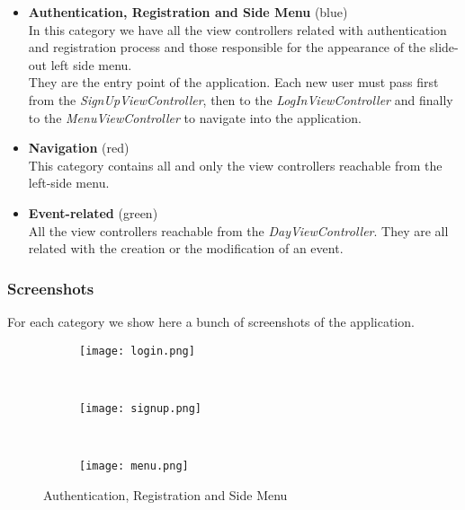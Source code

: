 \begin{itemize}
	\item \textbf{Authentication, Registration and Side Menu} (blue)\\
	In this category we have all the view controllers related with authentication and registration process and those responsible for the appearance of the slide-out left side menu.\\
	They are the entry point of the application.  Each new user must pass first from the \textit{SignUpViewController}, then to the \textit{LogInViewController} and finally to the \textit{MenuViewController} to navigate into the application.
	 
	\item \textbf{Navigation} (red)\\
	This category contains all and only the view controllers reachable from the left-side menu.
	
	\item \textbf{Event-related} (green)\\
	All the view controllers reachable from the \textit{DayViewController}. They are all related with the creation or the modification of an event.
\end{itemize}

\subsubsection*{Screenshots}
For each category we show here a bunch of screenshots of the application.
\begin{figure}[H]
	\centering
	\begin{subfigure}{0.25\textwidth}
		\centering
		\texttt{[image: login.png]}
	\end{subfigure}
	~
	\begin{subfigure}{0.25\textwidth}
		\centering
		\texttt{[image: signup.png]}
	\end{subfigure}
	~
	\begin{subfigure}{0.25\textwidth}
		\centering
		\texttt{[image: menu.png]}
	\end{subfigure}
	\caption{Authentication, Registration and Side Menu}
\end{figure}


